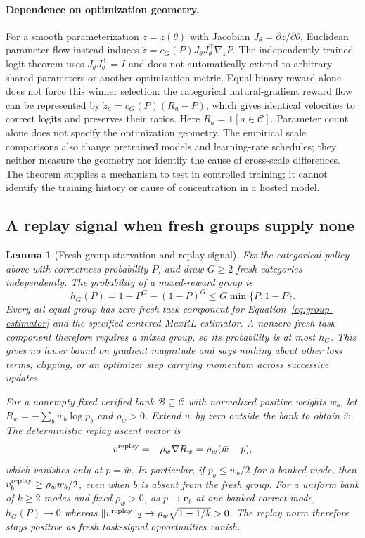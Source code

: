 \documentclass{article}
\newcommand{\1}{\mathbf 1}
\newtheorem{lemma}{Lemma}[section]
\theoremstyle{remark}
\theoremstyle{definition}
\theoremstyle{plain}
\begin{document}
\paragraph{Dependence on optimization geometry.}
For a smooth parameterization $z=z(\theta)$ with Jacobian
$J_\theta=\partial z/\partial\theta$, Euclidean parameter flow instead
induces $\dot z=c_G(P)J_\theta J_\theta^\top\nabla_zP$. The independently
trained logit theorem uses $J_\theta J_\theta^\top=I$ and does not automatically
extend to arbitrary shared parameters or another optimization metric. Equal
binary reward alone does not force this winner selection: the categorical
natural-gradient reward flow can be represented by
$\dot z_a=c_G(P)(R_a-P)$, which gives identical velocities to correct logits
and preserves their ratios. Here $R_a=\1[a\in\mathcal C]$.
Parameter count alone does not specify the optimization geometry. The empirical
scale
comparisons also change pretrained models and learning-rate schedules; they
neither measure the geometry nor identify the cause of cross-scale differences.
The theorem supplies a mechanism to test in controlled training; it cannot
identify the training history or cause of concentration in a hosted model.

\subsection{A replay signal when fresh groups supply none}
\label{app:theory-gradient-availability}

\begin{lemma}[Fresh-group starvation and replay signal]
\label{lem:replay-gradient-availability}
Fix the categorical policy above with correctness probability $P$, and draw
$G\ge2$ fresh categories independently. The probability of a mixed-reward
group is
\[
 h_G(P)=1-P^G-(1-P)^G\le G\min\{P,1-P\}.
\]
Every all-equal group has zero fresh task component for
Equation~\eqref{eq:group-estimator} and the specified centered MaxRL
estimator. A nonzero fresh task component therefore requires a mixed group,
so its probability is at most $h_G$. This gives no lower bound on gradient
magnitude and says nothing about other loss terms, clipping, or an optimizer step carrying momentum across successive updates.

For a nonempty fixed verified bank $\mathcal B\subseteq\mathcal C$ with
normalized positive weights $w_b$, let
$R_w=-\sum_b w_b\log p_b$ and $\rho_w>0$. Extend $w$ by zero outside the
bank to obtain $\bar w$. The deterministic replay ascent vector is
\[
 v^{\rm replay}=-\rho_w\nabla R_w=\rho_w(\bar w-p),
\]
which vanishes only at $p=\bar w$. In particular, if $p_b\le w_b/2$ for a banked
mode, then $v^{\rm replay}_b\ge\rho_w w_b/2$, even when $b$ is absent from the
fresh group. For a uniform bank of $k\ge2$ modes and fixed $\rho_w>0$, as
$p\to\mathbf e_b$ at one banked correct mode, $h_G(P)\to0$ whereas
$\|v^{\rm replay}\|_2\to\rho_w\sqrt{1-1/k}>0$.
The replay norm therefore stays positive as fresh task-signal opportunities vanish.
\end{lemma}
\end{document}
